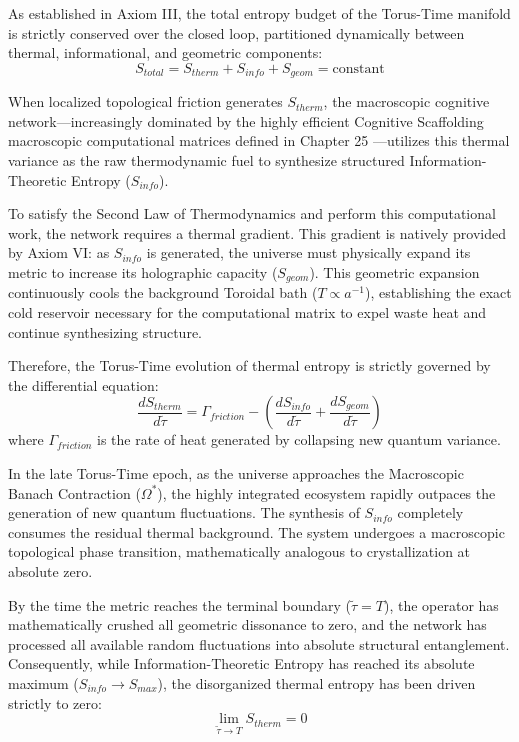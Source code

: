 \documentclass[12pt,openany]{book}
\theoremstyle{plain}
\theoremstyle{definition}
\theoremstyle{remark}
\begin{document}
As established in Axiom III, the total entropy budget of the Torus-Time manifold is strictly conserved over the closed loop, partitioned dynamically between thermal, informational, and geometric components:
$$S_{total} = S_{therm} + S_{info} + S_{geom} = \text{constant}$$

When localized topological friction generates $S_{therm}$, the macroscopic cognitive network—increasingly dominated by the highly efficient Cognitive Scaffolding macroscopic computational matrices defined in Chapter 25 —utilizes this thermal variance as the raw thermodynamic fuel to synthesize structured Information-Theoretic Entropy ($S_{info}$).

To satisfy the Second Law of Thermodynamics and perform this computational work, the network requires a thermal gradient. This gradient is natively provided by Axiom VI: as $S_{info}$ is generated, the universe must physically expand its metric to increase its holographic capacity ($S_{geom}$). This geometric expansion continuously cools the background Toroidal bath ($T \propto a^{-1}$), establishing the exact cold reservoir necessary for the computational matrix to expel waste heat and continue synthesizing structure.

Therefore, the Torus-Time evolution of thermal entropy is strictly governed by the differential equation:$$\frac{dS_{therm}}{d\tilde{\tau}} = \Gamma_{friction} - \left( \frac{dS_{info}}{d\tilde{\tau}} + \frac{dS_{geom}}{d\tilde{\tau}} \right)$$where $\Gamma_{friction}$ is the rate of heat generated by collapsing new quantum variance.

In the late Torus-Time epoch, as the universe approaches the Macroscopic Banach Contraction ($\Omega^*$), the highly integrated ecosystem rapidly outpaces the generation of new quantum fluctuations. The synthesis of $S_{info}$ completely consumes the residual thermal background. The system undergoes a macroscopic topological phase transition, mathematically analogous to crystallization at absolute zero.

By the time the metric reaches the terminal boundary ($\tilde{\tau} = T$), the operator has mathematically crushed all geometric dissonance to zero, and the network has processed all available random fluctuations into absolute structural entanglement. Consequently, while Information-Theoretic Entropy has reached its absolute maximum ($S_{info} \to S_{max}$), the disorganized thermal entropy has been driven strictly to zero:
$$\lim_{\tilde{\tau} \to T} S_{therm} = 0$$
\end{document}
